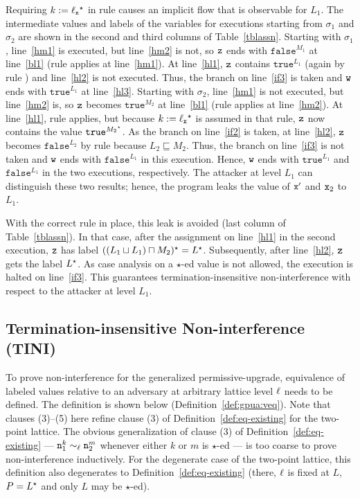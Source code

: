 Requiring $k := \ell_{\texttt{x}}{}^\star$ in rule  causes an
implicit flow that is observable for $L_1$. The intermediate values
and labels of the variables for executions starting from $\sigma_1$
and $\sigma_2$ are shown in the second and third columns of
Table~\ref{tblassn}. Starting with $\sigma_1$, line~\ref{hm1} is
executed, but line~\ref{hm2} is not, so $\texttt{z}$ ends with
$\texttt{false}^{M_1}$ at line~\ref{bl1} (rule  applies at
line~\ref{hm1}). At line~\ref{hl1}, $\texttt{z}$ contains $\texttt{true}^{L_1}$
(again by rule ) and line~\ref{hl2} is not executed. Thus, the
branch on line~\ref{if3} is taken and $\texttt{w}$ ends with
$\texttt{true}^{L_1}$ at line~\ref{hl3}. Starting with $\sigma_2$,
line~\ref{hm1} is not executed, but line~\ref{hm2} is, so $\texttt{z}$ becomes
$\texttt{true}^{M_2}$ at line~\ref{bl1} (rule  applies at
line~\ref{hm2}). At line~\ref{hl1}, rule  applies, but because
$k := \ell_{\texttt{x}}{}^\star$ is assumed in that rule, $\texttt{z}$ now contains the
value $\texttt{true}^{M_2{}^\star}$. As the branch on line~\ref{if2} is
taken, at line~\ref{hl2}, $\texttt{z}$ becomes $\texttt{false}^{L_2}$ by rule
 because $L_2 \sqsubseteq M_2$. Thus, the branch on
line~\ref{if3} is not taken and $\texttt{w}$ ends with $\texttt{false}^{L_1}$
in this execution. Hence, $\texttt{w}$ ends with $\texttt{true}^{L_1}$ and
$\texttt{false}^{L_1}$ in the two executions, respectively. The
attacker at level $L_1$ can distinguish these two results; hence, the
program leaks the value of $\texttt{x}'$ and $\texttt{x}_2$ to $L_1$.

With the correct  rule in place, this leak is avoided (last
column of Table~\ref{tblassn}). In that case, after the assignment on
line~\ref{hl1} in the second execution, $\texttt{z}$ has label $((L_1 \sqcup L_1) \sqcap
M_2){}^\star = L{}^\star$. Subsequently, after line~\ref{hl2}, $\texttt{z}$ gets the
label $L{}^\star$. As case analysis on a $\star$-ed value is not allowed,
the execution is halted on line~\ref{if3}. This guarantees
termination-insensitive non-interference with respect to the attacker
at level $L_1$.

\subsection{Termination-insensitive Non-interference (TINI)}

To prove non-interference for the generalized permissive-upgrade,
equivalence of labeled values relative to an adversary at arbitrary
lattice level $\ell$ needs to be defined. The definition is shown
below (Definition~\ref{def:gpua:veq}). Note that clauses (3)--(5) here
refine clause (3) of Definition~\ref{def:eq-existing} for the two-point
lattice. The obvious generalization of clause (3) of
Definition~\ref{def:eq-existing} --- $\texttt{n}_1^k \sim_\ell \texttt{n}_2^m$ whenever 
either $k$ or $m$ is $\star$-ed --- is too coarse to prove
non-interference inductively. For the degenerate case of the two-point
lattice, this definition also degenerates to
Definition~\ref{def:eq-existing} (there, $\ell$ is fixed at $L$, $P = 
L{}^\star$ and only $L$ may be $\star$-ed).

